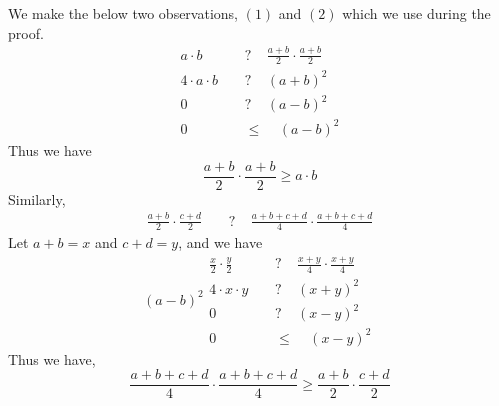 \documentclass{article}
\begin{document}
We make the below two observations, $(1)$ and $(2)$ which we use during the proof.
\begin{equation*}
	\begin{aligned}
		a \cdot b\ \ \ \ \  &? \ \ \ \ \  \frac{a+b}{2} \cdot \frac{a+b}{2}\\
		4 \cdot a \cdot b\ \ \ \ \ &?\ \ \ \ \ (a+b)^2\\
		0 \ \ \ \ \  &? \ \ \ \ \  (a-b)^2\\
		0 \ \ \ \ \  &\leq \ \ \ \ \  (a-b)^2
	\end{aligned}
\end{equation*}
Thus we have 
\begin{equation}
	\frac{a+b}{2} \cdot \frac{a+b}{2} \geq a \cdot b
\end{equation}
Similarly,
\begin{equation*}
	\begin{aligned}
		\frac{a+b}{2} \cdot \frac{c+d}{2}\ \ \ \ \ &?\ \ \ \ \  \frac{a+b+c+d}{4} \cdot \frac{a+b+c+d}{4}
	\end{aligned}
\end{equation*}
Let $a+b = x$ and $c+d = y$, and we have
\begin{equation*}(a-b)^2
	\begin{aligned}
		\frac{x}{2} \cdot \frac{y}{2}\ \ \ \ \ &?\ \ \ \ \  \frac{x+y}{4} \cdot \frac{x+y}{4}\\
		4 \cdot x \cdot y\ \ \ \ \  &?\ \ \ \ \  (x+y)^2\\
		0\ \ \ \ \ &? \ \ \ \ \  (x-y)^2\\
		0\ \ \ \ \ &\leq \ \ \ \ \  (x-y)^2
	\end{aligned}
\end{equation*}
Thus we have,
\begin{equation}
	\frac{a+b+c+d}{4} \cdot \frac{a+b+c+d}{4} \geq \frac{a+b}{2} \cdot \frac{c+d}{2}
\end{equation}
\end{document}
